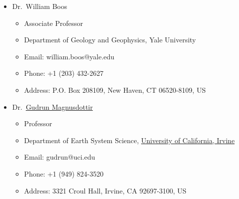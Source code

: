 \documentclass[11pt]{article}
\newcommand{\uci}{\href{http://www.uci.edu}{University of California, Irvine}}
\newcommand{\gudrun}{\href{http://sites.uci.edu/magnusdottir}{Gudrun Magnusdottir}}
\begin{document}
\begin{itemize}[leftmargin=4ex]
	\item Dr.~William Boos
	\begin{itemize}
		\item Associate Professor
		\item Department of Geology and Geophysics, Yale University
    		\item Email: william.boos@yale.edu
		\item Phone: +1 (203) 432-2627
    	 	\item Address: P.O. Box 208109, New Haven, CT 06520-8109, US 
	 	\end{itemize}
		
	\item Dr.~\gudrun{}
	\begin{itemize}
		\item Professor
		\item Department of Earth System Science, \uci{}
    		\item Email: gudrun@uci.edu
		\item Phone: +1 (949) 824-3520
    	 	\item Address: 3321 Croul Hall, Irvine, CA 92697-3100, US 
	 	\end{itemize}
	 
	 \end{itemize}
 
\end{document}

